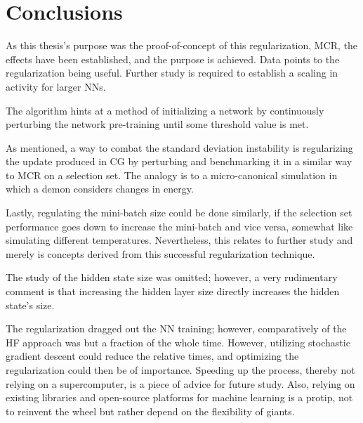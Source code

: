 \chapter{Conclusions}

As this thesis's purpose was the proof-of-concept of this regularization, MCR, the effects have been established, and the purpose is achieved. Data points to the regularization being useful. Further study is required to establish a scaling in activity for larger NNs.

The algorithm hints at a method of initializing a network by continuously perturbing the network pre-training until some threshold value is met. 

As mentioned, a way to combat the standard deviation instability is regularizing the update produced in CG by perturbing and benchmarking it in a similar way to MCR on a selection set. The analogy is to a micro-canonical simulation in which a demon considers changes in energy. 

Lastly, regulating the mini-batch size could be done similarly, if the selection set performance goes down to increase the mini-batch and vice versa, somewhat like simulating different temperatures. Nevertheless, this relates to further study and merely is concepts derived from this successful regularization technique.

The study of the hidden state size was omitted; however, a very rudimentary comment is that increasing the hidden layer size directly increases the hidden state's size.

The regularization dragged out the NN training; however, comparatively of the HF approach was but a fraction of the whole time. However, utilizing stochastic gradient descent could reduce the relative times, and optimizing the regularization could then be of importance. Speeding up the process, thereby not relying on a supercomputer, is a piece of advice for future study. Also, relying on existing libraries and open-source platforms for machine learning is a protip, not to reinvent the wheel but rather depend on the flexibility of giants.

